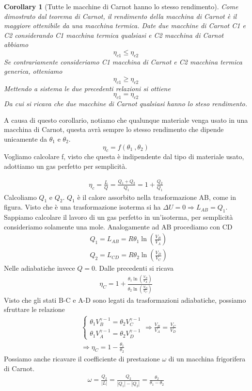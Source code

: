 \documentclass[10pt,a4paper]{article}
\newtheorem{corollary}{Corollary}[theorem]
\begin{document}
\begin{corollary}[Tutte le macchine di Carnot hanno lo stesso rendimento]
Come dimostrato dal teorema di Carnot, il rendimento della macchina di Carnot è il maggiore ottenibile da una macchina termica. Date due macchine di Carnot C1 e C2 considerando C1 macchina termica qualsiasi e C2 macchina di Carnot abbiamo \[\eta_{c1}\leq \eta_{c2}\] Se contrariamente consideriamo C1 macchina di Carnot e C2 macchina termica generica, otteniamo \[\eta_{c1}\geq \eta_{c2}\] Mettendo a sistema le due precedenti relazioni si ottiene \[\eta_{c1} = \eta_{c2}\] Da cui si ricava che due macchine di Carnot qualsiasi hanno lo steso rendimento. 
\end{corollary}

A causa di questo corollario, notiamo che qualunque materiale venga usato in una macchina di Carnot, questa avrà sempre lo stesso rendimento che dipende unicamente da $\theta_1$ e $\theta_2$. 
\[\eta_ c= f(\theta_1\ ,\theta_2 )\]
Vogliamo calcolare f, visto che questa è indipendente dal tipo di materiale usato, adottiamo un gas perfetto per semplicità. 

\begin{align*}
	\eta_c = \frac{L}{Q}=\frac{Q_1 + Q_2}{Q_1}= 1 + \frac{Q_2}{Q_1}
\end{align*} 
Calcoliamo \(Q_1\) e \(Q_2\). \(Q_1\) è il calore assorbito nella trasformazione AB, come in figura. Visto che è una trasformazione isoterma si ha \(\Delta U = 0 \Rightarrow L_{AB}  = Q_1\). Sappiamo calcolare il lavoro di un gas perfetto in un'isoterma, per semplicità consideriamo solamente una mole. Analogamente ad AB procediamo con CD
\begin{align*}
	&Q_1 = L_{AB} = R\theta_1\ln(\frac{V_B}{V_A})\\
	&Q_2 = L_{CD} = R\theta_2\ln(\frac{V_D}{V_C})
\end{align*}
Nelle adiabatiche invece $Q=0$. Dalle precedenti si ricava
\begin{align*}
	\eta_C = 1+\frac{\theta_1\ln(\frac{V_B}{V_A})}{\theta_2\ln(\frac{V_D}{V_C})}
\end{align*}
Visto che gli stati B-C e A-D sono legati da trasformazioni adiabatiche, possiamo sfruttare le relazione 
\begin{align*}
	&\begin{cases}
		\theta_1 V_B^{\gamma -1} = \theta_2 V_C^{\gamma -1}\\
		\theta_1 V_A^{\gamma -1} = \theta_2 V_D^{\gamma -1}
	\end{cases}
	\Rightarrow \frac{V_B}{V_A} = \frac{V_C}{V_D}\\
	&\Rightarrow \eta_C = 1-\frac{\theta_1}{\theta_2}
\end{align*}
Possiamo anche ricavare il coefficiente di prestazione $\omega$ di un macchina frigorifera di Carnot. 
\begin{align*}
\omega = \frac{Q_2}{|L|} = \frac{Q_2}{|Q_1|-|Q_2|} = \frac{\theta_2}{\theta_1 - \theta_2}
\end{align*}
\end{document}
